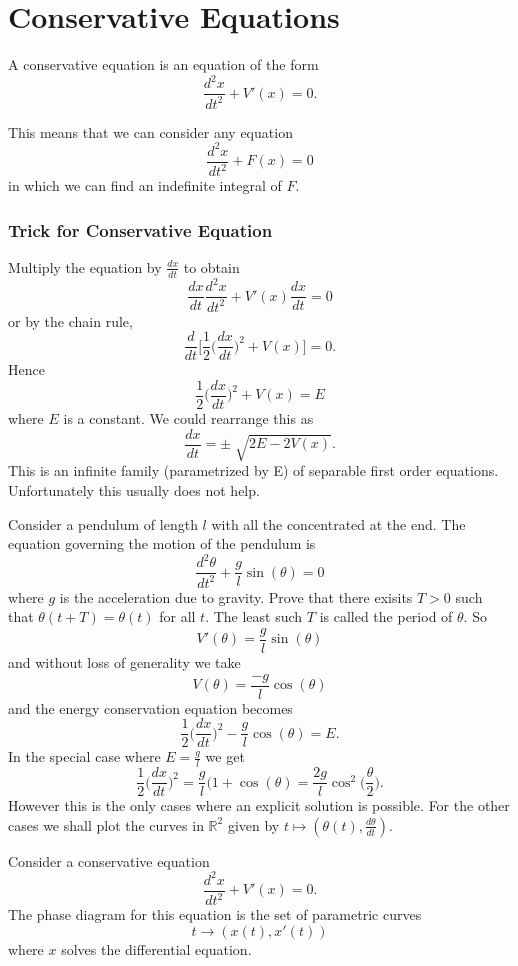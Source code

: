 
\chapter{Conservative Equations}
\begin{definition}
A conservative equation is an equation of the form $$\frac{d^2x}{dt^2} +V'(x) = 0.$$
\end{definition}
\begin{remark}
This means that we can consider any equation $$\frac{d^2x}{dt^2} + F(x) = 0$$ in which we can find an indefinite integral of $F.$
\end{remark}
\subsection*{Trick for Conservative Equation}
Multiply the equation by $\frac{dx}{dt}$ to obtain $$\frac{dx}{dt}\frac{d^2x}{dt^2}+V'(x)\frac{dx}{dt} = 0$$ or by the chain rule, $$\frac{d}{dt}\bigg[\frac{1}{2}\bigg(\frac{dx}{dt}\bigg)^2+V(x)\bigg] = 0.$$ Hence $$\frac{1}{2}\bigg(\frac{dx}{dt}\bigg)^2+V(x) = E$$ where $E$ is a constant. We could rearrange this as $$\frac{dx}{dt} = \pm \sqrt[]{2E-2V(x)}.$$ This is an infinite family  (parametrized by E) of separable first order equations. Unfortunately this usually does not help.
\begin{example}
Consider a pendulum of length $l$ with all the concentrated at the end. The equation governing the motion of the pendulum is $$\frac{d^2\theta}{dt^2} +\frac{g}{l}\sin(\theta) = 0$$ where $g$ is the acceleration due to gravity. Prove that there exisits $T>0$ such that $\theta (t+T) = \theta(t)$ for all $t.$ The least such $T$ is called the period of $\theta.$ So $$V'(\theta) = \frac{g}{l}\sin(\theta)$$ and without loss of generality we take $$V(\theta) = \frac{-g}{l}\cos(\theta)$$ and the energy conservation equation becomes $$\frac{1}{2}\bigg(\frac{dx}{dt}\bigg)^2- \frac{g}{l}\cos(\theta) = E.$$ In the special case where $E = \frac{g}{l}$ we get $$\frac{1}{2}\bigg(\frac{dx}{dt}\bigg)^2 = \frac{g}{l}(1+\cos(\theta) = \frac{2g}{l}\cos^2\bigg(\frac{\theta}{2}\bigg).$$ However this is the only cases where an explicit solution is possible. For the other cases we shall plot the curves in $\mathbb{R}^2$ given by $t \mapsto(\theta(t), \frac{d\theta}{dt}).$
\end{example}
\begin{definition}
Consider a conservative equation $$\frac{d^2x}{dt^2} + V'(x) = 0.$$ The phase diagram for this equation is the set of parametric curves $$t \rightarrow(x(t),x'(t))$$ where $x$ solves the differential equation.
\end{definition}
